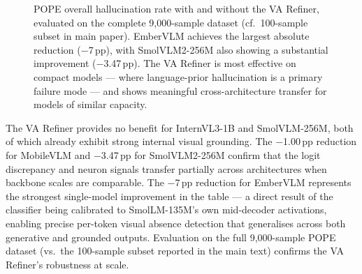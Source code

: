 \documentclass[runningheads]{llncs}
\begin{document}
\begin{figure}[ht]
\centering
{}
\caption{POPE overall hallucination rate with and without the VA Refiner,
evaluated on the complete 9,000-sample dataset (cf.\ 100-sample subset in main paper).
EmberVLM achieves the largest absolute reduction ($-$7\,pp), with SmolVLM2-256M
also showing a substantial improvement ($-$3.47\,pp). The VA Refiner is most
effective on compact models — where language-prior hallucination is a primary
failure mode — and shows meaningful cross-architecture transfer for models of
similar capacity.}
\label{fig:pope-bar}
\end{figure}

The VA Refiner provides no benefit for InternVL3-1B and SmolVLM-256M, both of
which already exhibit strong internal visual grounding. The $-$1.00\,pp reduction
for MobileVLM and $-$3.47\,pp for SmolVLM2-256M confirm that the logit discrepancy
and neuron signals transfer partially across architectures when backbone scales are
comparable. The $-$7\,pp reduction for EmberVLM represents the strongest single-model
improvement in the table — a direct result of the classifier being calibrated to
SmolLM-135M's own mid-decoder activations, enabling precise per-token visual absence
detection that generalises across both generative and grounded outputs. Evaluation
on the full 9,000-sample POPE dataset (vs.\ the 100-sample subset reported in the
main text) confirms the VA Refiner's robustness at scale.
\end{document}
